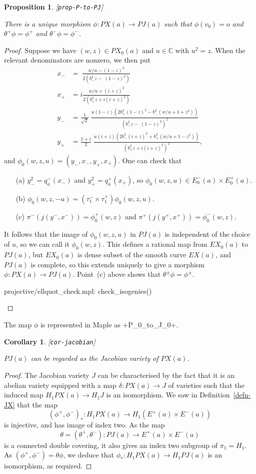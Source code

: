 \documentclass[reqno]{amsart}
\newcommand{\lbl}[1]{\label{#1}\textup{[\texttt{#1}]}\par}
\newcommand{\lbl}{\label}
\newcommand{\dl}        {\delta}
\newcommand{\tht}       {\theta}
\newcommand{\C}         {{\mathbb{C}}}
\newcommand{\tm}        {\times}
\newcommand{\rt}        {\sqrt{2}}
\renewcommand{\:}{\colon}
\newtheorem{proposition}[theorem]{Proposition}
\newtheorem{corollary}[theorem]{Corollary}
\theoremstyle{definition}
\begin{document}
\begin{proposition}\lbl{prop-P-to-PJ}
 There is a unique morphism $\phi\:PX(a)\to PJ(a)$ such that
 $\phi(v_0)=o$ and $\tht^+\phi=\phi^+$ and $\tht^-\phi=\phi^-$.
\end{proposition}
\begin{proof}
 Suppose we have $(w,z)\in PX_0(a)$ and $u\in\C$ with $u^2=z$.  When the
 relevant denominators are nonzero, we then put
 \begin{align*}
  x_- &= \;\frac{w/u - (1-z)^2}{2(b_-^2z-\;(1-z)^2)} \\
  x_+ &=  i\frac{w/u + (i+z)^2}{2(b_+^2z+ i(i+z)^2)} \\
  y_- &= \frac{1}{\rt}\; \frac{u(1-z)(2b_+^2(1-z)^2-b_-^2(w/u+1+z^2))}{(b_-^2z-\;(1-z)^2)^2} \\
  y_+ &= \frac{1+i}{2}\; \frac{u(i+z)(2b_-^2(i+z)^2+b_+^2(w/u+1-z^2))}{(b_+^2z+i (i+z)^2)^2},
 \end{align*}
 and $\phi_0(w,z,u)=(y_-,x_-,y_+,x_+)$.  One can check that
 \begin{itemize}
  \item[(a)] $y_-^2=q^-_a(x_-)$ and $y_+^2=q^+_a(x_+)$, so
   $\phi_0(w,z,u)\in E^-_0(a)\tm E^+_0(a)$.
  \item[(b)] $\phi_0(w,z,-u)=(\tau_1^-\tm\tau_1^+)\phi_0(w,z,u)$.
  \item[(c)] $\pi^-(j(y^-,x^-))=\phi^+_0(w,z)$ and
   $\pi^+(j(y^+,x^+))=\phi^-_0(w,z)$.
 \end{itemize}
 It follows that the image of $\phi_0(w,z,u)$ in $PJ(a)$ is
 independent of the choice of $u$, so we can call it $\phi_0(w,z)$.
 This defines a rational map from $EX_0(a)$ to $PJ(a)$, but $EX_0(a)$
 is dense subset of the smooth curve $EX(a)$, and $PJ(a)$ is complete,
 so this extends uniquely to give a morphism $\phi\:PX(a)\to PJ(a)$.
 Point~(c) above shows that $\tht^\pm\phi=\phi^\pm$.
 \begin{checks}
  projective/ellquot_check.mpl: check_isogenies()
 \end{checks}
\end{proof}
The map $\phi$ is represented in Maple as \mcode+P_0_to_J_0+.

\begin{corollary}\lbl{cor-jacobian}
 $PJ(a)$ can be regarded as the Jacobian variety of $PX(a)$.
\end{corollary}
\begin{proof}
 The Jacobian variety $J$ can be characterised by the fact that it is
 an abelian variety equipped with a map $\dl\:PX(a)\to J$ of varieties
 such that the induced map $H_1PX(a)\to H_1J$ is an isomorphism.  We
 saw in Definition~\ref{defn-JX} that the map
 \[ (\phi^+,\phi^-)_*\: H_1PX(a) \to H_1(E^+(a)\tm E^-(a)) \]
 is injective, and has image of index two.  As the map
 \[ \tht=(\tht^+,\tht^-)\:PJ(a)\to E^+(a)\tm E^-(a) \]
 is a connected double covering, it also gives an index two subgroup
 of $\pi_1=H_1$.  As $(\phi^+,\phi^-)=\tht\phi$, we deduce that
 $\phi_*\:H_1PX(a)\to H_1PJ(a)$ is an isomorphism, as required.
\end{proof}
\end{document}
